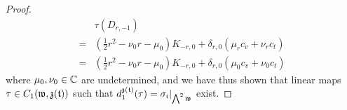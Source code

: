 \begin{proof}
$$\begin{aligned}
                            & \tau( D_{r, -1} )
                            \\
                            = & \left( \frac12 r^2 - \nu_0 r - \mu_0 \right) K_{-r, 0} + \delta_{r, 0} ( \mu_r c_v + \nu_r c_t )
                            \\
                            = & \left( \frac12 r^2 - \nu_0 r - \mu_0 \right) K_{-r, 0} + \delta_{r, 0} ( \mu_0 c_v + \nu_0 c_t )
                        \end{aligned}
                    $$
                where $\mu_0, \nu_0 \in \mathbb{C}$ are undetermined, and we have thus shown that linear maps $\tau \in C_1(\mathfrak{w}, \mathfrak{z}(\mathfrak{t}))$ such that $d_1^{\mathfrak{z}(\mathfrak{t})}(\tau) = \sigma_i|_{\bigwedge^2 \mathfrak{w}}$ exist.
            \end{proof}

